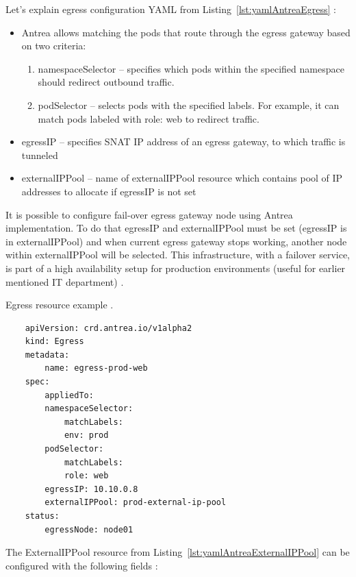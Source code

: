 Let's explain egress configuration YAML from Listing~\ref{lst:yamlAntreaEgress} \cite{AntreaEgressArch}:
\begin{itemize}
    \item Antrea allows matching the pods that route through the egress gateway based on two criteria:

    \begin{enumerate}
        \item namespaceSelector -- specifies which pods within the specified namespace should redirect outbound traffic.
        \item podSelector -- selects pods with the specified labels. For example, it can match pods labeled with role: web to redirect traffic.
    \end{enumerate}

    \item egressIP -- specifies SNAT IP address of an egress gateway, to which traffic is tunneled
    \item externalIPPool -- name of externalIPPool resource which contains pool of IP addresses to allocate if egressIP is not set
\end{itemize}

It is possible to configure fail-over egress gateway node using Antrea implementation. To do that egressIP and externalIPPool must be set (egressIP is in externalIPPool) and when current egress gateway stops working, another node within externalIPPool will be selected. This infrastructure, with a failover service, is part of a high availability setup for production environments (useful for earlier mentioned IT department) \cite{AntreaEgressArch}.


\begin{listing}[htb]
    \centering
    \caption{Egress resource example \cite{AntreaEgressArch}.}
    \begin{verbatim}
    apiVersion: crd.antrea.io/v1alpha2
    kind: Egress
    metadata:
        name: egress-prod-web
    spec:
        appliedTo:
        namespaceSelector:
            matchLabels:
            env: prod
        podSelector:
            matchLabels:
            role: web
        egressIP: 10.10.0.8
        externalIPPool: prod-external-ip-pool
    status:
        egressNode: node01
    \end{verbatim}
    \label{lst:yamlAntreaEgress}
\end{listing}

The ExternalIPPool resource from Listing~\ref{lst:yamlAntreaExternalIPPool} can be configured with the following fields \cite{AntreaEgressArch}:

